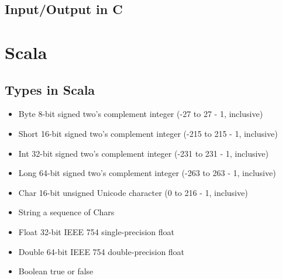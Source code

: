 \documentclass[11pt,a4paper,oneside]{book}
\begin{document}
\chapter{Input/Output in C}

\part{Scala}
\setcounter{chapter}{0}
\chapter{Types in Scala}
\begin{itemize}
\itemsep-3pt
\item  Byte        8-bit signed two's complement integer (-27 to 27 - 1, inclusive)
\item  Short       16-bit signed two's complement integer (-215 to 215 - 1, inclusive)
\item Int         32-bit signed two's complement integer (-231 to 231 - 1, inclusive)        
\item Long        64-bit signed two's complement integer (-263 to 263 - 1, inclusive)
\item Char        16-bit unsigned Unicode character (0 to 216 - 1, inclusive)        
\item String        a sequence of Chars        
\item Float        32-bit IEEE 754 single-precision float
\item Double        64-bit IEEE 754 double-precision float        
\item Boolean        true or false
\end{itemize} 
\end{document}
